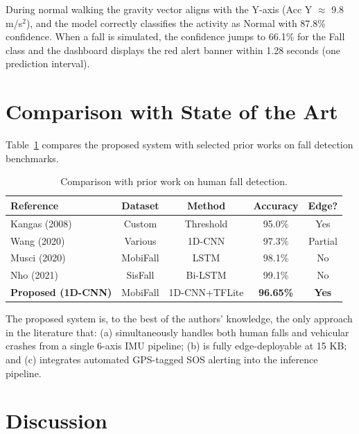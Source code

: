 During normal walking the gravity vector aligns with the Y-axis (Acc Y $\approx$ 9.8 m/s$^2$), and the model correctly classifies the activity as Normal with 87.8\% confidence. When a fall is simulated, the confidence jumps to 66.1\% for the Fall class and the dashboard displays the red alert banner within 1.28 seconds (one prediction interval).

\section{Comparison with State of the Art}
\label{sec:sota}

Table~\ref{tab:sota} compares the proposed system with selected prior works on fall detection benchmarks.

\begin{table}[h!]
    \centering\footnotesize
    \renewcommand{\arraystretch}{1.3}
    \caption{Comparison with prior work on human fall detection.}
    \label{tab:sota}
    \begin{tabular}{|l|c|c|c|c|}
        \hline
        \textbf{Reference} & \textbf{Dataset} & \textbf{Method} & \textbf{Accuracy} & \textbf{Edge?} \\ \hline
        Kangas (2008) \citep{kangas2008}   & Custom   & Threshold  & 95.0\% & Yes \\ \hline
        Wang (2020) \citep{wang2020cnn}    & Various  & 1D-CNN     & 97.3\% & Partial \\ \hline
        Musci (2020) \citep{musci2020}     & MobiFall & LSTM       & 98.1\% & No \\ \hline
        Nho (2021) \citep{nho2021}         & SisFall  & Bi-LSTM    & 99.1\% & No \\ \hline
        \textbf{Proposed (1D-CNN)} & MobiFall & 1D-CNN+TFLite & \textbf{96.65\%} & \textbf{Yes} \\ \hline
    \end{tabular}
\end{table}

The proposed system is, to the best of the authors' knowledge, the only approach in the literature that: (a) simultaneously handles both human falls and vehicular crashes from a single 6-axis IMU pipeline; (b) is fully edge-deployable at 15 KB; and (c) integrates automated GPS-tagged SOS alerting into the inference pipeline.

\section{Discussion}
\label{sec:discussion}

